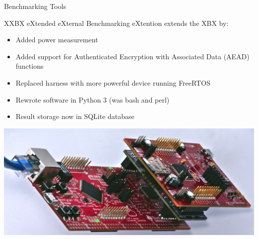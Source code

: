 \documentclass[xcolor=pdftex,dvipsnames,table,final]{beamer}
\begin{document}
\begin{frame}[fragile]{}
\begin{columns}[t, totalwidth=\textwidth]
\begin{column}{.31\linewidth}
\begin{block}{Benchmarking Tools}
      \end{block}
%        
      \begin{block}{XXBX}
        {e\color{red}X}tended e{\color{red}X}ternal {\color{red}B}enchmarking 
        e{\color{red}X}tention extends the XBX by:%
        \begin{itemize}
          \item Added power measurement
          \item Added support for Authenticated Encryption with Associated Data (AEAD) functions
          \item Replaced harness with more powerful device running FreeRTOS
          \item Rewrote software in Python 3 (was bash and perl)
          \item Result storage now in SQLite database
        \end{itemize}
        \begin{center}
          \includegraphics[scale=1.5]{../figures/xxbx-tilted}

\end{center}
\end{block}
\end{column}
\end{columns}
\end{frame}
\end{document}

